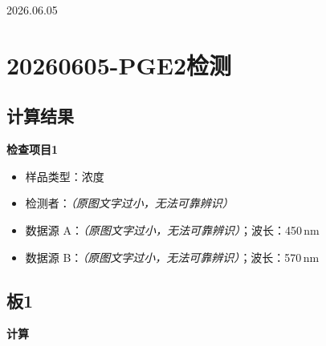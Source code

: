 \documentclass[UTF8,10pt,a4paper,fontset=fandol]{ctexart}
\newcommand{\handwritten}[1]{#1}
\begin{document}
\handwritten{2026.06.05}

\newpage

\section*{20260605-PGE2检测}

\subsection*{计算结果}

\textbf{检查项目1}

\begin{itemize}
    \item 样品类型：浓度
    \item 检测者：\textit{（原图文字过小，无法可靠辨识）}
    \item 数据源 A：\textit{（原图文字过小，无法可靠辨识）}；波长：450\,nm
    \item 数据源 B：\textit{（原图文字过小，无法可靠辨识）}；波长：570\,nm
\end{itemize}

\subsection*{板1}

\textbf{计算}
\end{document}
